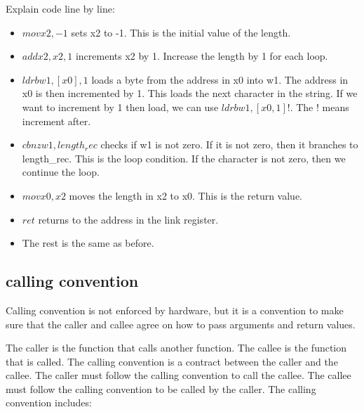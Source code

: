 \documentclass[letterpaper,12pt]{article}
\begin{document}
Explain code line by line:\begin{itemize}
    \item $mov x2, -1$ sets x2 to -1. This is the initial value of the length.
    \item $add x2, x2, 1$ increments x2 by 1. Increase the length by 1 for each loop.
    \item $ldrb w1, [x0], 1$ loads a byte from the address in x0 into w1. The address in x0 is then incremented by 1. This loads the next character in the string. If we want to increment by 1 then load, we can use $ldrb w1, [x0, 1]!$. The $!$ means increment after.
    \item $cbnz w1, length_rec$ checks if w1 is not zero. If it is not zero, then it branches to length\_rec. This is the loop condition. If the character is not zero, then we continue the loop.
    \item $mov x0, x2$ moves the length in x2 to x0. This is the return value.
    \item $ret$ returns to the address in the link register.
    \item The rest is the same as before.
\end{itemize}

\subsection{calling convention}
Calling convention is not enforced by hardware, but it is a convention to make
sure that the caller and callee agree on how to pass arguments and return
values.

The caller is the function that calls another function. The callee is the
function that is called. The calling convention is a contract between the
caller and the callee. The caller must follow the calling convention to call
the callee. The callee must follow the calling convention to be called by the
caller. The calling convention includes:
\end{document}

